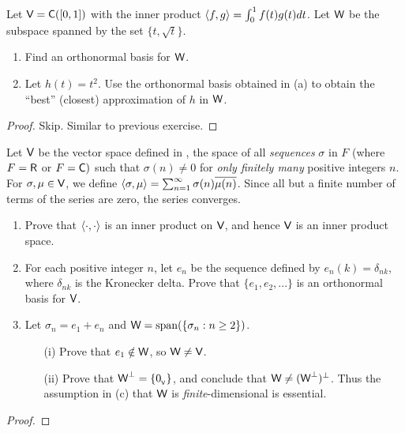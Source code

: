 \begin{exercise} \label{exercise 6.2.22}
Let \(\textsf{V} = \textsf{C}([0, 1])\) with the inner product \(\left< f, g \right> = \int_0^1 f(t)g(t) dt\).
Let \(\textsf{W}\) be the subspace spanned by the \LID{} set \(\{ t, \sqrt{t} \}\).
\begin{enumerate}
\item Find an orthonormal basis for \(\textsf{W}\).
\item Let \(h(t) = t^2\).
Use the orthonormal basis obtained in (a) to obtain the ``best'' (closest) approximation of \(h\) in \(\textsf{W}\).
\end{enumerate}
\end{exercise}

\begin{proof}
Skip. Similar to previous exercise.
\end{proof}

\begin{exercise} \label{exercise 6.2.23}
Let \(\textsf{V}\) be the vector space defined in , the space of all \emph{sequences} \(\sigma\) in \(F\) (where \(F = \textsf{R}\) or \(F = \textsf{C})\) such that \(\sigma(n) \ne 0\) for \emph{only finitely many} positive integers \(n\).
For \(\sigma, \mu \in \textsf{V}\), we define \(\left< \sigma, \mu \right> = \sum_{n = 1}^{\infty} \sigma(n) \overline{\mu(n)}\).
Since all but a finite number of terms of the series are zero, the series converges.
\begin{enumerate}
\item Prove that \(\left< \cdot, \cdot \right>\) is an inner product on \(\textsf{V}\), and hence \(\textsf{V}\) is an inner product space.
\item For each positive integer \(n\), let \(e_n\) be the sequence defined by \(e_n(k) = \delta_{nk}\), where \(\delta_{nk}\) is the Kronecker delta.
Prove that \(\{ e_1, e_2, ... \}\) is an orthonormal basis for \(\textsf{V}\).
\item Let \(\sigma_n = e_1 + e_n\) and \(\textsf{W} = \operatorname{span}(\{ \sigma_n : n \ge 2 \})\).
    \begin{enumerate}
    \item[(i)] Prove that \(e_1 \notin \textsf{W}\), so \(\textsf{W} \ne \textsf{V}\).
    \item[(ii)] Prove that \(\textsf{W}^{\perp} = \{ 0_{_{\textsf{V}}} \}\), and conclude that \(\textsf{W} \ne (\textsf{W}^{\perp})^{\perp}\).
    Thus the assumption in (c) that \(\textsf{W}\) is \emph{finite}-dimensional is essential.
    \end{enumerate}
\end{enumerate}
\end{exercise}

\begin{proof}
\end{proof}
